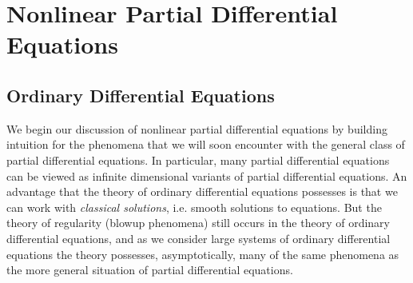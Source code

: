 %
%
%
%
%
%
%
%




\part{Nonlinear Partial Differential Equations}

\chapter{Ordinary Differential Equations}

We begin our discussion of nonlinear partial differential equations by building intuition for the phenomena that we will soon encounter with the general class of partial differential equations. In particular, many partial differential equations can be viewed as infinite dimensional variants of partial differential equations. An advantage that the theory of ordinary differential equations possesses is that we can work with \emph{classical solutions}, i.e. smooth solutions to equations. But the theory of regularity (blowup phenomena) still occurs in the theory of ordinary differential equations, and as we consider large systems of ordinary differential equations the theory possesses, asymptotically, many of the same phenomena as the more general situation of partial differential equations.

